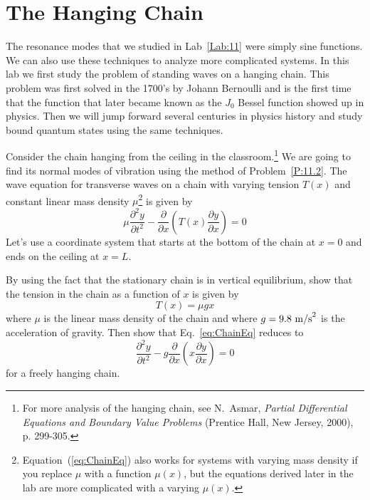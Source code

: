 \chapter{The Hanging Chain}
\label{Lab:12} 

The resonance modes that we studied in Lab~\ref{Lab:11} were simply
sine functions.  We can also use these techniques to analyze more
complicated systems.  In this lab we first study the problem of
standing waves on a hanging chain. This  problem was first solved in
the 1700's by Johann Bernoulli and is the first time that the
function that later became known as the $J_0$ Bessel function showed
up in physics.  Then we will jump forward several centuries in
physics history and study bound quantum states using the same
techniques.




Consider the chain hanging from the ceiling in the
classroom.\footnote{For more analysis of the hanging chain, see N.\
Asmar, {\it Partial Differential Equations and Boundary Value
Problems} (Prentice Hall, New Jersey, 2000), p. 299-305.} We are
going to find its normal modes of vibration using the method of
Problem~\ref{P:11.2}.  The wave equation for transverse waves on a
chain with varying tension $T(x)$ and constant linear mass density
$\mu$\footnote{Equation~(\ref{eq:ChainEq}) also works for systems
with varying mass density if you replace $\mu$ with a function
$\mu(x)$, but the equations derived later in the lab are more
complicated with a varying $\mu(x)$.} is given by
\begin{equation}\label{eq:ChainEq}
    \mu \frac{\partial^2 y}{\partial t^2} - \frac{\partial}{\partial x}
    \left(  T(x) \frac{\partial y}{\partial x} \right) = 0
\end{equation}
Let's use a coordinate system that starts at the bottom of the chain
at $x=0$ and ends on the ceiling at $x=L$.


\begin{enumerate}
\probtwo \label{P:12.1}
By using the fact that the stationary chain is in vertical
equilibrium, show that the tension in the chain as a function of $x$
is given by
\begin{equation}
    T(x) = \mu g x
\end{equation}
where $\mu$ is the linear mass density of the chain and
where $g=9.8~{\rm m/s}^2$ is the acceleration of gravity.
Then show that Eq.~\eqref{eq:ChainEq} reduces to
\begin{equation}\label{eq:ChainEq2}
    \frac{\partial^2 y}{\partial t^2} - g \frac{\partial}{\partial x}
    \left(  x \frac{\partial y}{\partial x} \right) = 0
\end{equation}
for a freely hanging chain.
\end{enumerate}

